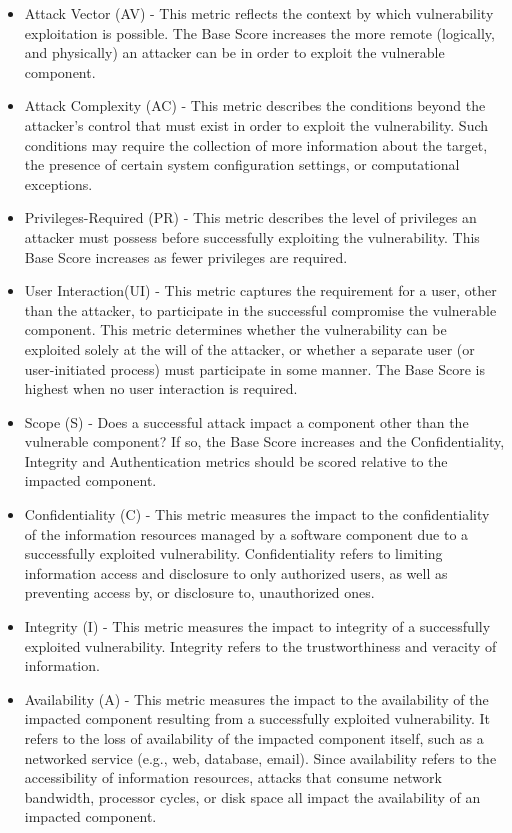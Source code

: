\begin{itemize}
	\item Attack Vector (AV)  - This metric reflects the context by which vulnerability exploitation is possible. The Base Score increases the more remote (logically, and physically) an attacker can be in order to exploit the vulnerable component.  \\
	\item Attack Complexity (AC)   - This metric describes the conditions beyond the attacker’s control that must exist in order to exploit the vulnerability. Such conditions may require the collection of more information about the target, the presence of certain system configuration settings, or computational exceptions. \\
	\item Privileges-Required (PR) - This metric describes the level of privileges an attacker must possess before successfully exploiting the vulnerability. This Base Score increases as fewer privileges are required. \\
	\item User Interaction(UI) - This metric captures the requirement for a user, other than the attacker, to participate in the successful compromise the vulnerable component. This metric determines whether the vulnerability can be exploited solely at the will of the attacker, or whether a separate user (or user-initiated process) must participate in some manner. The Base Score is highest when no user interaction is required. \\
	\item Scope (S) - Does a successful attack impact a component other than the vulnerable component? If so, the Base Score increases and the Confidentiality, Integrity and Authentication metrics should be scored relative to the impacted component. \\
	\item Confidentiality (C) - This metric measures the impact to the confidentiality of the information resources managed by a software component due to a successfully exploited vulnerability. Confidentiality refers to limiting information access and disclosure to only authorized users, as well as preventing access by, or disclosure to, unauthorized ones. \\
	\item Integrity (I) - This metric measures the impact to integrity of a successfully exploited vulnerability. Integrity refers to the trustworthiness and veracity of information. \\
	\item Availability (A) - This metric measures the impact to the availability of the impacted component resulting from a successfully exploited vulnerability. It refers to the loss of availability of the impacted component itself, such as a networked service (e.g., web, database, email). Since availability refers to the accessibility of information resources, attacks that consume network bandwidth, processor cycles, or disk space all impact the availability of an impacted component. \\
\end{itemize}

